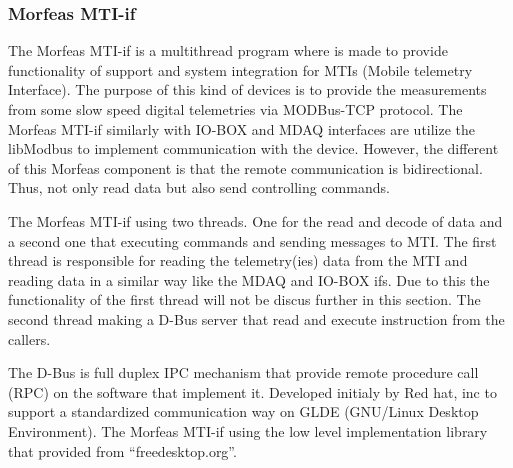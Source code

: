 \subsubsection{Morfeas MTI-if}
The Morfeas MTI-if is a multithread program where is made to provide functionality of support and system integration for MTIs (Mobile telemetry Interface).
The purpose of this kind of devices is to provide the measurements from some slow speed digital telemetries via MODBus-TCP protocol.
The Morfeas MTI-if similarly with IO-BOX and MDAQ interfaces are utilize the libModbus to implement communication with the device.
However, the different of this Morfeas component is that the remote communication is bidirectional.
Thus, not only read data but also send controlling commands.

The Morfeas MTI-if using two threads. One for the read and decode of data and a second one that executing commands and sending messages to MTI.
The first thread is responsible for reading the telemetry(ies) data from the MTI and reading data in a similar way like the MDAQ and IO-BOX ifs.
Due to this the functionality of the first thread will not be discus further in this section.
The second thread making a D-Bus server that read and execute instruction from the callers.

The D-Bus is full duplex IPC mechanism that provide remote procedure call (RPC) on the software that implement it.
Developed initialy by Red hat, inc to support a standardized communication way on GLDE (GNU/Linux Desktop Environment).
The Morfeas MTI-if using the low level implementation library that provided from ``freedesktop.org''.\\

